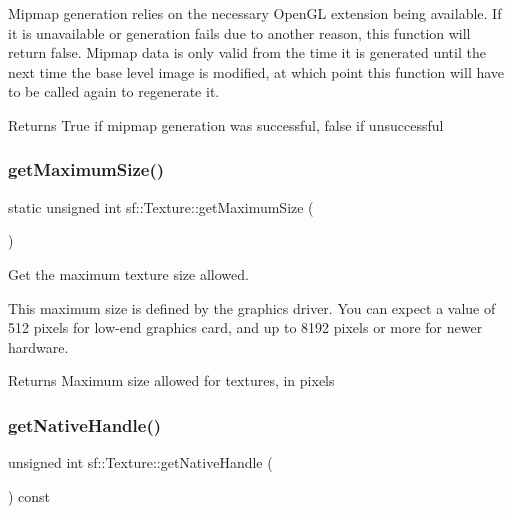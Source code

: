 Mipmap generation relies on the necessary Open\+GL extension being available. If it is unavailable or generation fails due to another reason, this function will return false. Mipmap data is only valid from the time it is generated until the next time the base level image is modified, at which point this function will have to be called again to regenerate it.

\begin{DoxyReturn}{Returns}
True if mipmap generation was successful, false if unsuccessful \begin{DoxyVerb}\end{DoxyVerb}
 
\end{DoxyReturn}
\mbox{\label{classsf_1_1_texture_a0bf905d487b104b758549c2e9e20a3fb}} 
\subsubsection{\texorpdfstring{getMaximumSize()}{getMaximumSize()}}
{\footnotesize\ttfamily static unsigned int sf\+::\+Texture\+::get\+Maximum\+Size (\begin{DoxyParamCaption}{ }\end{DoxyParamCaption})\hspace{0.3cm}{\ttfamily [static]}}



Get the maximum texture size allowed. 

This maximum size is defined by the graphics driver. You can expect a value of 512 pixels for low-\/end graphics card, and up to 8192 pixels or more for newer hardware.

\begin{DoxyReturn}{Returns}
Maximum size allowed for textures, in pixels \begin{DoxyVerb}\end{DoxyVerb}
 
\end{DoxyReturn}
\mbox{\label{classsf_1_1_texture_a674b632608747bfc27b53a4935c835b0}} 
\subsubsection{\texorpdfstring{getNativeHandle()}{getNativeHandle()}}
{\footnotesize\ttfamily unsigned int sf\+::\+Texture\+::get\+Native\+Handle (\begin{DoxyParamCaption}{ }\end{DoxyParamCaption}) const}



